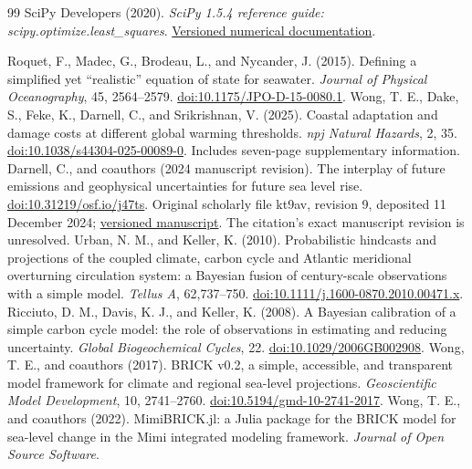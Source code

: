 \documentclass[11pt]{article}
\begin{document}
\clearpage
\begin{thebibliography}{99}
 SciPy Developers (2020).
\emph{SciPy 1.5.4 reference guide: scipy.optimize.least\_squares}.
\href{https://docs.scipy.org/doc/scipy-1.5.4/reference/generated/scipy.optimize.least_squares.html}{Versioned numerical documentation}.

 Roquet, F., Madec, G., Brodeau, L., and Nycander, J. (2015).
Defining a simplified yet ``realistic'' equation of state for seawater.
\emph{Journal of Physical Oceanography}, 45, 2564--2579.
\href{https://doi.org/10.1175/JPO-D-15-0080.1}{doi:10.1175/JPO-D-15-0080.1}.
 Wong, T. E., Dake, S., Feke, K., Darnell, C., and Srikrishnan, V.
(2025). Coastal adaptation and damage costs at different global warming
thresholds. \emph{npj Natural Hazards}, 2, 35.
\href{https://doi.org/10.1038/s44304-025-00089-0}{doi:10.1038/s44304-025-00089-0}.
Includes seven-page supplementary information.
 Darnell, C., and coauthors (2024 manuscript revision).
The interplay of future emissions and geophysical uncertainties for future sea level rise.
\href{https://doi.org/10.31219/osf.io/j47ts}{doi:10.31219/osf.io/j47ts}.
Original scholarly file kt9av, revision 9, deposited 11 December 2024;
\href{https://osf.io/download/kt9av/?revision=9}{versioned manuscript}.
The citation's exact manuscript revision is unresolved.
 Urban, N. M., and Keller, K. (2010).
Probabilistic hindcasts and projections of the coupled climate, carbon cycle
and Atlantic meridional overturning circulation system: a Bayesian fusion
of century-scale observations with a simple model. \emph{Tellus A}, 62,737--750.
\href{https://doi.org/10.1111/j.1600-0870.2010.00471.x}{doi:10.1111/j.1600-0870.2010.00471.x}.
 Ricciuto, D. M., Davis, K. J., and Keller, K. (2008).
A Bayesian calibration of a simple carbon cycle model: the role of observations
in estimating and reducing uncertainty. \emph{Global Biogeochemical Cycles}, 22.
\href{https://doi.org/10.1029/2006GB002908}{doi:10.1029/2006GB002908}.
 Wong, T. E., and coauthors (2017).
BRICK v0.2, a simple, accessible, and transparent model framework for climate
and regional sea-level projections. \emph{Geoscientific Model Development}, 10, 2741--2760.
\href{https://doi.org/10.5194/gmd-10-2741-2017}{doi:10.5194/gmd-10-2741-2017}.
 Wong, T. E., and coauthors (2022). MimiBRICK.jl: a Julia package
for the BRICK model for sea-level change in the Mimi integrated modeling framework.
\emph{Journal of Open Source Software}.

\end{thebibliography}
\end{document}
